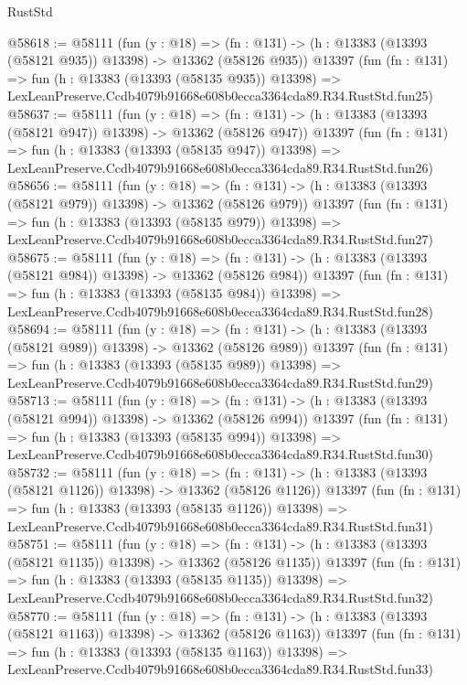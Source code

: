 \begin{lexlean}{RustStd}
\begin{coremodule}
@58618 := @58111
    (fun (y : @18) =>
    (fn : @131) -> (h : @13383 (@13393 (@58121 @935)) @13398) -> @13362 (@58126 @935))
    @13397
    (fun (fn : @131) =>
    fun (h : @13383 (@13393 (@58135 @935)) @13398) =>
    LexLeanPreserve.Ccdb4079b91668e608b0ecca3364cda89.R34.RustStd.fun25)
@58637 := @58111
    (fun (y : @18) =>
    (fn : @131) -> (h : @13383 (@13393 (@58121 @947)) @13398) -> @13362 (@58126 @947))
    @13397
    (fun (fn : @131) =>
    fun (h : @13383 (@13393 (@58135 @947)) @13398) =>
    LexLeanPreserve.Ccdb4079b91668e608b0ecca3364cda89.R34.RustStd.fun26)
@58656 := @58111
    (fun (y : @18) =>
    (fn : @131) -> (h : @13383 (@13393 (@58121 @979)) @13398) -> @13362 (@58126 @979))
    @13397
    (fun (fn : @131) =>
    fun (h : @13383 (@13393 (@58135 @979)) @13398) =>
    LexLeanPreserve.Ccdb4079b91668e608b0ecca3364cda89.R34.RustStd.fun27)
@58675 := @58111
    (fun (y : @18) =>
    (fn : @131) -> (h : @13383 (@13393 (@58121 @984)) @13398) -> @13362 (@58126 @984))
    @13397
    (fun (fn : @131) =>
    fun (h : @13383 (@13393 (@58135 @984)) @13398) =>
    LexLeanPreserve.Ccdb4079b91668e608b0ecca3364cda89.R34.RustStd.fun28)
@58694 := @58111
    (fun (y : @18) =>
    (fn : @131) -> (h : @13383 (@13393 (@58121 @989)) @13398) -> @13362 (@58126 @989))
    @13397
    (fun (fn : @131) =>
    fun (h : @13383 (@13393 (@58135 @989)) @13398) =>
    LexLeanPreserve.Ccdb4079b91668e608b0ecca3364cda89.R34.RustStd.fun29)
@58713 := @58111
    (fun (y : @18) =>
    (fn : @131) -> (h : @13383 (@13393 (@58121 @994)) @13398) -> @13362 (@58126 @994))
    @13397
    (fun (fn : @131) =>
    fun (h : @13383 (@13393 (@58135 @994)) @13398) =>
    LexLeanPreserve.Ccdb4079b91668e608b0ecca3364cda89.R34.RustStd.fun30)
@58732 := @58111
    (fun (y : @18) =>
    (fn : @131) -> (h : @13383 (@13393 (@58121 @1126)) @13398) -> @13362 (@58126 @1126))
    @13397
    (fun (fn : @131) =>
    fun (h : @13383 (@13393 (@58135 @1126)) @13398) =>
    LexLeanPreserve.Ccdb4079b91668e608b0ecca3364cda89.R34.RustStd.fun31)
@58751 := @58111
    (fun (y : @18) =>
    (fn : @131) -> (h : @13383 (@13393 (@58121 @1135)) @13398) -> @13362 (@58126 @1135))
    @13397
    (fun (fn : @131) =>
    fun (h : @13383 (@13393 (@58135 @1135)) @13398) =>
    LexLeanPreserve.Ccdb4079b91668e608b0ecca3364cda89.R34.RustStd.fun32)
@58770 := @58111
    (fun (y : @18) =>
    (fn : @131) -> (h : @13383 (@13393 (@58121 @1163)) @13398) -> @13362 (@58126 @1163))
    @13397
    (fun (fn : @131) =>
    fun (h : @13383 (@13393 (@58135 @1163)) @13398) =>
    LexLeanPreserve.Ccdb4079b91668e608b0ecca3364cda89.R34.RustStd.fun33)

\end{coremodule}
\end{lexlean}
